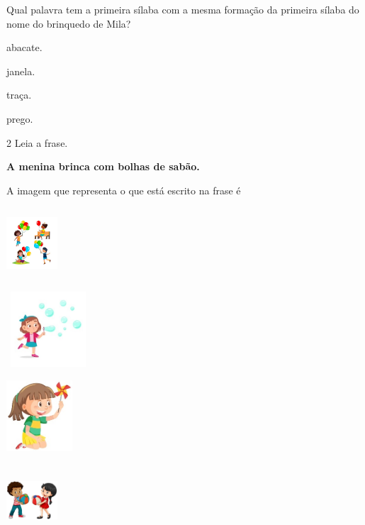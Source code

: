 Qual palavra tem a primeira sílaba com a mesma formação da primeira
sílaba do nome do brinquedo de Mila?

\begin{multicols}{2}
\begin{escolha}
\item abacate.

\item janela.

\item traça.

\item prego.
\end{escolha}
\end{multicols}

\num{2} Leia a frase.

\begin{myquote}
\textbf{A menina brinca com bolhas de sabão.}
\end{myquote}

A imagem que representa o que está escrito na frase é

\begin{multicols}{2}
\begin{escolha}
\item\includegraphics[width=0.75159in,height=1.04531in]{media/image78.jpeg}

\item\includegraphics[width=1.23681in,height=1.10139in]{media/image79.jpeg}

\item\includegraphics[width=0.97361in,height=1.05069in]{media/image80.jpeg}

\item\includegraphics[width=0.75437in,height=1.04404in]{media/image81.jpeg}
\end{escolha}
\end{multicols}


